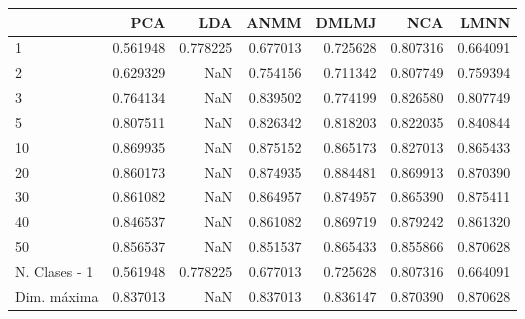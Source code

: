 \begin{tabular}{lrrrrrr}
\toprule
{} &       PCA &       LDA &      ANMM &     DMLMJ &       NCA &      LMNN \\
\midrule
1             &  0.561948 &  0.778225 &  0.677013 &  0.725628 &  0.807316 &  0.664091 \\
2             &  0.629329 &       NaN &  0.754156 &  0.711342 &  0.807749 &  0.759394 \\
3             &  0.764134 &       NaN &  0.839502 &  0.774199 &  0.826580 &  0.807749 \\
5             &  0.807511 &       NaN &  0.826342 &  0.818203 &  0.822035 &  0.840844 \\
10            &  0.869935 &       NaN &  0.875152 &  0.865173 &  0.827013 &  0.865433 \\
20            &  0.860173 &       NaN &  0.874935 &  0.884481 &  0.869913 &  0.870390 \\
30            &  0.861082 &       NaN &  0.864957 &  0.874957 &  0.865390 &  0.875411 \\
40            &  0.846537 &       NaN &  0.861082 &  0.869719 &  0.879242 &  0.861320 \\
50            &  0.856537 &       NaN &  0.851537 &  0.865433 &  0.855866 &  0.870628 \\
N. Clases - 1 &  0.561948 &  0.778225 &  0.677013 &  0.725628 &  0.807316 &  0.664091 \\
Dim. máxima   &  0.837013 &       NaN &  0.837013 &  0.836147 &  0.870390 &  0.870628 \\
\bottomrule
\end{tabular}
